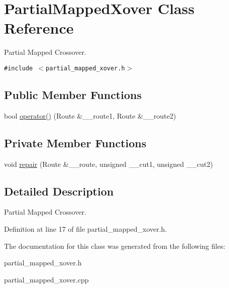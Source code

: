 \hypertarget{classPartialMappedXover}{
\section{Partial\-Mapped\-Xover Class Reference}
\label{classPartialMappedXover}
}
Partial Mapped Crossover.  


{\tt \#include $<$partial\_\-mapped\_\-xover.h$>$}

\subsection*{Public Member Functions}
\begin{CompactItemize}
\item 
\hypertarget{classPartialMappedXover_1cda6ea86ca36e5de0125f4ba5cfc695}{
bool \hyperlink{classPartialMappedXover_1cda6ea86ca36e5de0125f4ba5cfc695}{operator()} (Route \&\_\-\_\-route1, Route \&\_\-\_\-route2)}
\label{classPartialMappedXover_1cda6ea86ca36e5de0125f4ba5cfc695}

\end{CompactItemize}
\subsection*{Private Member Functions}
\begin{CompactItemize}
\item 
\hypertarget{classPartialMappedXover_b6d4035544aff3b2b3fe4b0eeea185a2}{
void \hyperlink{classPartialMappedXover_b6d4035544aff3b2b3fe4b0eeea185a2}{repair} (Route \&\_\-\_\-route, unsigned \_\-\_\-cut1, unsigned \_\-\_\-cut2)}
\label{classPartialMappedXover_b6d4035544aff3b2b3fe4b0eeea185a2}

\end{CompactItemize}


\subsection{Detailed Description}
Partial Mapped Crossover. 



Definition at line 17 of file partial\_\-mapped\_\-xover.h.

The documentation for this class was generated from the following files:\begin{CompactItemize}
\item 
partial\_\-mapped\_\-xover.h\item 
partial\_\-mapped\_\-xover.cpp\end{CompactItemize}
